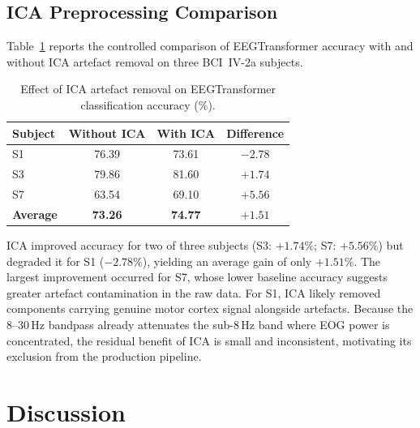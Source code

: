 \documentclass[12pt, a4paper]{article}
\begin{document}
\subsection{ICA Preprocessing Comparison}
\label{sec:ica_results}

Table~\ref{tab:ica_comparison} reports the controlled comparison of EEGTransformer accuracy with and without ICA artefact removal on three BCI~IV-2a subjects.

\begin{table}[htbp]
\centering
\caption{Effect of ICA artefact removal on EEGTransformer classification accuracy (\%).}
\label{tab:ica_comparison}
\begin{tabular}{lccc}
\toprule
\textbf{Subject} & \textbf{Without ICA} & \textbf{With ICA} & \textbf{Difference} \\
\midrule
S1 & 76.39 & 73.61 & $-2.78$ \\
S3 & 79.86 & 81.60 & $+1.74$ \\
S7 & 63.54 & 69.10 & $+5.56$ \\
\midrule
\textbf{Average} & \textbf{73.26} & \textbf{74.77} & $\mathbf{+1.51}$ \\
\bottomrule
\end{tabular}
\end{table}

ICA improved accuracy for two of three subjects (S3: $+1.74\%$; S7: $+5.56\%$) but degraded it for S1 ($-2.78\%$), yielding an average gain of only $+1.51\%$. The largest improvement occurred for S7, whose lower baseline accuracy suggests greater artefact contamination in the raw data. For S1, ICA likely removed components carrying genuine motor cortex signal alongside artefacts. Because the 8--30\,Hz bandpass already attenuates the sub-8\,Hz band where EOG power is concentrated, the residual benefit of ICA is small and inconsistent, motivating its exclusion from the production pipeline.

\section{Discussion}

\end{document}
